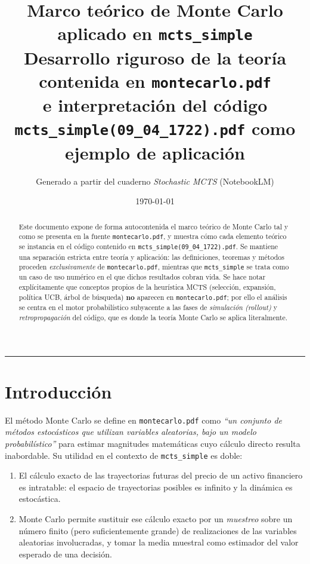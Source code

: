 \documentclass[11pt,a4paper]{article}
\title{\textbf{Marco teórico de Monte Carlo aplicado en \texttt{mcts\_simple}}\\[0.4em]
\large Desarrollo riguroso de la teoría contenida en \texttt{montecarlo.pdf} \\ e interpretación del código \texttt{mcts\_simple(09\_04\_1722).pdf} como ejemplo de aplicación}
\author{Generado a partir del cuaderno \emph{Stochastic MCTS} (NotebookLM)}
\date{\today}
\theoremstyle{definition}
\begin{document}
\maketitle

\begin{abstract}
\noindent Este documento expone de forma autocontenida el marco teórico de Monte Carlo tal y como se presenta en la fuente \texttt{montecarlo.pdf}, y muestra cómo cada elemento teórico se instancia en el código contenido en \texttt{mcts\_simple(09\_04\_1722).pdf}. Se mantiene una separación estricta entre teoría y aplicación: las definiciones, teoremas y métodos proceden \emph{exclusivamente} de \texttt{montecarlo.pdf}, mientras que \texttt{mcts\_simple} se trata como un caso de uso numérico en el que dichos resultados cobran vida. Se hace notar explícitamente que conceptos propios de la heurística MCTS (selección, expansión, política UCB, árbol de búsqueda) \textbf{no} aparecen en \texttt{montecarlo.pdf}; por ello el análisis se centra en el motor probabilístico subyacente a las fases de \emph{simulación (rollout)} y \emph{retropropagación} del código, que es donde la teoría Monte Carlo se aplica literalmente.
\end{abstract}

\tableofcontents
\vspace{1em}
\hrule
\vspace{1em}

\section{Introducción}

El método Monte Carlo se define en \texttt{montecarlo.pdf} como \emph{``un conjunto de métodos estocásticos que utilizan variables aleatorias, bajo un modelo probabilístico''} para estimar magnitudes matemáticas cuyo cálculo directo resulta inabordable. Su utilidad en el contexto de \texttt{mcts\_simple} es doble:

\begin{enumerate}[leftmargin=1.4em]
    \item El cálculo exacto de las trayectorias futuras del precio de un activo financiero es intratable: el espacio de trayectorias posibles es infinito y la dinámica es estocástica.
    \item Monte Carlo permite sustituir ese cálculo exacto por un \emph{muestreo} sobre un número finito (pero suficientemente grande) de realizaciones de las variables aleatorias involucradas, y tomar la media muestral como estimador del valor esperado de una decisión.
\end{enumerate}
\end{document}
